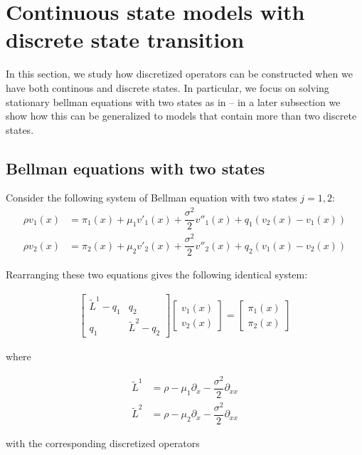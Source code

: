 \documentclass[11pt]{article}
\theoremstyle{definition}
\begin{document}
\section{Continuous state models with discrete state transition}
In this section, we study how discretized operators can be constructed when we have both continous and discrete states. In particular, we focus on solving stationary bellman equations with two states as in \cite{achdou17} -- in a later subsection we show how this can be generalized to models that contain more than two discrete states.

\subsection{Bellman equations with two states}
Consider the following system of Bellman equation with two states $j = 1, 2$:
\begin{align} 
	\rho v_{1}(x) &= \pi_1(x)+\mu_1 v'_1 (x) + \dfrac{\sigma^2}{2} v''_1 (x) +q_{1}\left(v_{2}(x)-v_{1}(x) \right) \\ \rho v_{2}(x) &=
	\pi_2(x)+\mu_2 v'_2 (x) + \dfrac{\sigma^2}{2} v''_2 (x) +q_{2}\left(v_{1}(x)-v_{2}(x)\right)
\end{align}

Rearranging these two equations gives the following identical system:

\begin{align} 
\begin{bmatrix}
\tilde{L}^1 - q_1 & q_2 \\ q_1 & \tilde{L}^2 - q_2
\end{bmatrix}
\begin{bmatrix}
v_1 (x) \\ v_2(x)
\end{bmatrix}
 =
\begin{bmatrix}
\pi_1 (x) \\
\pi_2 (x)
\end{bmatrix}\label{eq:continuous-and-discrete-system}
\end{align}

where

\begin{align}
\tilde{L}^1 &= \rho - \mu_1 \partial_{x} - \dfrac{\sigma^2}{2} \partial_{xx} \\
\tilde{L}^2 &= \rho - \mu_2 \partial_{x} - \dfrac{\sigma^2}{2} \partial_{xx}
\end{align}

with the corresponding discretized operators
\end{document}
